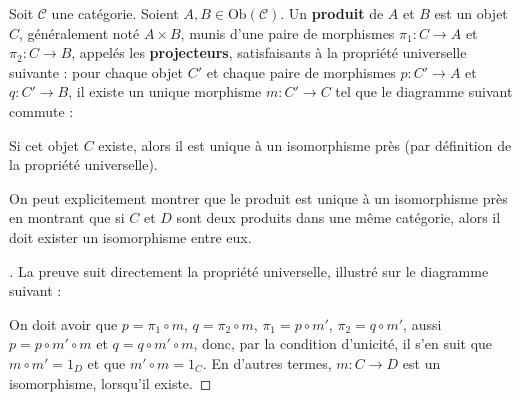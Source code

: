 \documentclass{article}
\begin{document}
\begin{definition}[Produit]{}
    Soit $\mathcal C$ une catégorie. Soient $A, B\in\text{Ob}(\mathcal C)$. Un \textbf{produit} de $A$ et $B$ est un objet $C$, généralement noté $A\times B$, munis d'une paire de morphismes $\pi_1:C\to A$ et $\pi_2:C\to B$, appelés les \textbf{projecteurs}, satisfaisants à la propriété universelle suivante : pour chaque objet $C'$ et chaque paire de morphismes $p:C'\to A$ et $q:C'\to B$, il existe un unique morphisme $m:C'\to C$ tel que le diagramme suivant commute :

    \begin{center}
    \end{center}

    \noindent
    Si cet objet $C$ existe, alors il est unique à un isomorphisme près (par définition de la propriété universelle).
\end{definition}

On peut explicitement montrer que le produit est unique à un isomorphisme près en montrant que si $C$ et $D$ sont deux produits dans une même catégorie, alors il doit exister un isomorphisme entre eux.

\begin{proof}[]{}
    La preuve suit directement la propriété universelle, illustré sur le diagramme suivant :
    \begin{center}
    \end{center}
    On doit avoir que $p=\pi_1\circ m$, $q=\pi_2\circ m$, $\pi_1=p\circ m'$, $\pi_2=q\circ m'$, aussi $p=p\circ m'\circ m$ et $q=q\circ m'\circ m$, donc, par la condition d'unicité, il s'en suit que $m\circ m'=1_D$ et que $m'\circ m=1_C$. En d'autres termes, $m:C\to D$ est un isomorphisme, lorsqu'il existe.
\end{proof}
\end{document}
